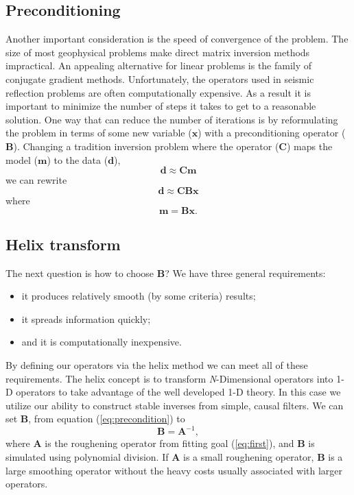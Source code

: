 \subsection{Preconditioning}
Another important consideration is the speed of convergence of the problem.  
The size of most geophysical
problems make direct matrix inversion methods impractical. 
An appealing alternative for linear problems is the family of
conjugate gradient methods.  Unfortunately, 
the operators used in seismic reflection  problems
are often computationally expensive.
As a result it is important to minimize the number of steps it takes
to get to a reasonable solution.
One way that can reduce the number of iterations is by reformulating the 
problem in terms of some new variable ($\mathbf x$) with a preconditioning
operator ($\mathbf B$).  Changing a tradition inversion problem where the
operator ($\mathbf C$) maps the model ($\mathbf m$) to the data ($\mathbf d$),
\begin{equation}
\mathbf d \approx \mathbf C \mathbf m
\label{eq:precondition1}
\end{equation}
we can rewrite 
\begin{equation}
\mathbf d \approx \mathbf C \mathbf B \mathbf x
\end{equation}
where
\begin{equation}
\mathbf m = \mathbf B  \mathbf x.
\label{eq:precondition}
\end{equation}

\subsection{Helix transform}
The next question is  how to choose  $\mathbf B$?
We have three general requirements:
\begin{itemize}
\item it produces relatively smooth (by some criteria) results;
\item it spreads information quickly;
\item and it is computationally inexpensive.
\end{itemize}
By defining our operators via the helix method 
\cite{Claerbout.sep.95.jon1} we can meet all of these
requirements.
The helix concept is to transform {\it N}-Dimensional
operators into  1-D operators  to take
advantage of the well developed  1-D theory.
In this case we utilize our ability to construct 
stable inverses from simple, causal filters.  
 We can set $\mathbf B$,  from equation  (\ref{eq:precondition})  to
\begin{equation}
\mathbf B = \mathbf  A^{-1} ,
\label{eq:inverse}
\end{equation}
where $\mathbf A$ is the roughening operator from fitting
goal (\ref{eq:first}), and $\mathbf B$ is simulated using
polynomial division.
If $\mathbf A$ is a small roughening
operator, $\mathbf B$ is a large smoothing operator without the
heavy costs usually associated with larger operators.

